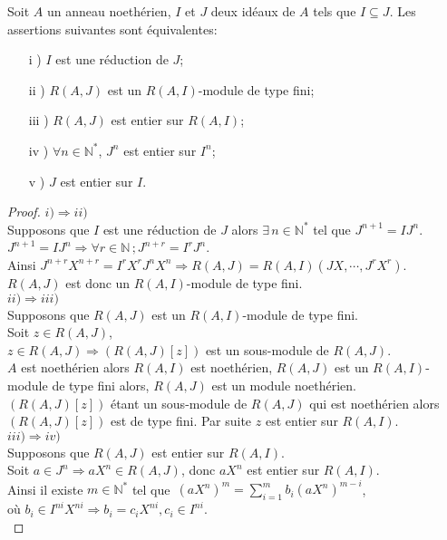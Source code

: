 \begin{maproposition}
	Soit $A$ un anneau noethérien, $I$ et $J$ deux idéaux de $A$ tels que $I \subseteq J$. Les assertions suivantes sont équivalentes: 
	\begin{enumerate}
		\item[i] ) $I$ est une réduction de $J$;
		\item[ii] ) $R(A,J)$ est un $R(A,I)$-module de type fini;
		\item[iii] ) $R(A,J)$ est entier sur $R(A,I)$;
		\item[iv] ) $\forall n \in \mathbb{N^*}$, $J^n$ est entier sur $I^n$;
		\item[v] ) $J$ est entier sur $I$.
	\end{enumerate}
\end{maproposition}
\begin{proof}
	$i) \Rightarrow ii)$ \\
	Supposons que $I$ est une réduction de $J$ alors $\exists \, n \in \mathbb{N}^{*}$ tel que $J^{n+1} = IJ^{n}$.\\
	$J^{n+1} = IJ^{n} \Rightarrow \forall r \in \mathbb{N} \, ; J^{n+r} = I^rJ^{n}$.\\
	Ainsi $J^{n+r} X^{n+r} = I^r X^rJ^{n} X^n \Rightarrow R(A,J) = R(A,I)(JX, \cdots ,J^rX^r)$.\\
	$R(A,J)$ est donc un $R(A,I)$-module de type fini.\\
	$ii) \Rightarrow iii)$ \\
	Supposons que $R(A,J)$ est un $R(A,I)$-module de type fini.\\
	Soit $z \in R(A,J)$,\\
	$z \in R(A,J) \Rightarrow (R(A,J)[z])$ est un sous-module de $R(A,J)$.\\
	$A$ est noethérien alors $R(A,I)$ est noethérien, $R(A,J)$ est un $R(A,I)$-module de type fini alors, $R(A,J)$ est un module noethérien.\\
	$(R(A,J)[z])$ étant un sous-module de $R(A,J)$ qui est noethérien alors $(R(A,J)[z])$ est de type fini. Par suite $z$ est entier sur $R(A,I)$.\\
	$iii) \Rightarrow iv)$ \\
	Supposons que $R(A,J)$ est entier sur $R(A,I)$.\\
	Soit $a \in J^n \Rightarrow aX^n \in R(A,J)$, donc $aX^n$ est entier sur $R(A,I)$.\\
	Ainsi il existe $m \in \mathbb{N^*}$  tel que  $\, (aX^n)^m = \displaystyle \sum_{i=1}^{m}{b_i (aX^n)^{m-i}}$,\\ où $b_i \in I^{ni} X^{ni} \Rightarrow b_i = c_i X^{ni} , c_i \in I^{ni}$.\\

\end{proof}
